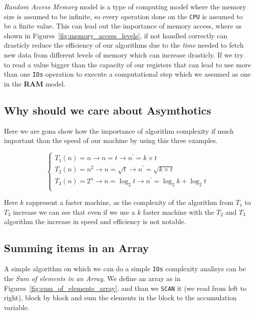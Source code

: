 \textit{Random Access Memory} model is a type of computing model
where the memory size is assumed to be infinite, so every operation
done on the \texttt{CPU} is assumed to be a finite value. This can lead
out the importance of memory access, where as shown in
Figures~\ref{fig:memory_access_levels}, if not handled correctly can
drasticly reduce the efficiency of our
algorithms due to the \textit{time} needed to fetch new data from
different levels of memory which can increase drasticly.
If we try to read a value bigger than the capacity of our registers
that can lead to use more than one \texttt{IOs} operation to execute
a computational step which we assumed as one in the \textbf{RAM} model.

\subsection{Why should we care about Asymthotics}

Here we are gona show how the importance of algorithm complexity if
much important than the speed of our machine by using this three examples.

\[
  \begin{cases}
    T_1(n) = n  \rightarrow n = t \rightarrow n^{'} = k \times t \\

    T_2(n) = n^2 \rightarrow n = \sqrt{t} \rightarrow n^{'} = \sqrt{k
    \times t} \\

    T_3(n) = 2^n \rightarrow n = \log_{2}{t} \rightarrow n^{'} =
    \log_{2}{k} + \log_{2}{t}\\
  \end{cases}
\]

Here $k$ rappresent a faster machine, as the complexity
of the algorithm from $T_1$ to $T_3$ increase we can see that even if
we use a $k$ faster machine with the $T_2$ and $T_3$ algorithm the
increase in speed and efficiency is not notable.

\subsection{Summing items in an Array}

A simple algorithm on which we can do a simple \texttt{IOs}
complexity analisys can be the \textit{Sum of elements in an Array}.
We define an array as in Figures~\ref{fig:sum_of_elements_array}, and
than we \texttt{SCAN} it (we
read from left to right), block by block and sum the elements in the
block to the accumulation variable.

